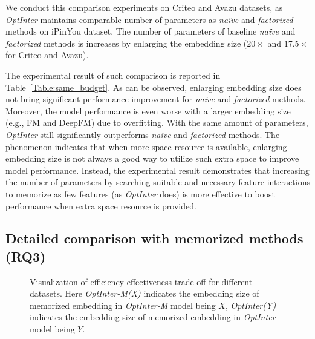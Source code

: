 \documentclass[conference]{IEEEtran}
\begin{document}
We conduct this comparison experiments on Criteo and Avazu datasets, as \textit{OptInter} maintains comparable number of parameters as \emph{naïve} and \emph{factorized} methods on iPinYou dataset. The number of parameters of baseline \emph{naïve} and \emph{factorized} methods is increases by enlarging the embedding size ($20\times$ and $17.5\times$ for Criteo and Avazu).

The experimental result of such comparison is reported in Table~\ref{Table:same_budget}. 
As can be observed, enlarging embedding size does not bring significant performance improvement for \emph{naïve} and \emph{factorized} methods. Moreover, the model performance is even worse with a larger embedding size (e.g., FM and DeepFM) due to overfitting.
With the same amount of parameters, \textit{OptInter} still significantly outperforms \emph{naïve} and \emph{factorized} methods. The phenomenon indicates that when more space resource is available, enlarging embedding size is not always a good way to utilize such extra space to improve model performance. Instead, the experimental result demonstrates that increasing the number of parameters by searching suitable and necessary feature interactions to memorize as few features (as \textit{OptInter} does) is more effective to boost performance when extra space resource is provided. 

\subsection{Detailed comparison with memorized methods (RQ3)}

\begin{figure}[!htbp]
\centering
{}
\caption{Visualization of efficiency-effectiveness trade-off for different datasets.  Here \textit{OptInter-M(X)} indicates the embedding size of memorized embedding in \textit{OptInter-M} model being $X$, \textit{OptInter(Y)} indicates the embedding size of memorized embedding in \textit{OptInter} model being $Y$.
}
\label{fig:param_AUC}
\end{figure}
\end{document}
